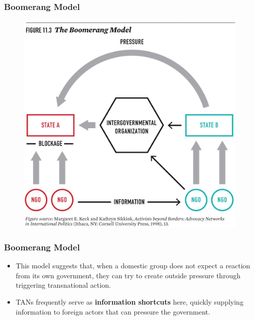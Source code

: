 \documentclass{beamer}
\begin{document}
\begin{frame} 
	\frametitle{\LARGE{Boomerang Model}}
	\begin{figure}[ht!]
		\centering
		\includegraphics[width=\textwidth,height=0.9\textheight,keepaspectratio]{boomerang.jpg}
	\end{figure}
\end{frame}

\begin{frame} 
	\frametitle{\LARGE{Boomerang Model}}
	\begin{itemize}
		\item This model suggests that, when a domestic group does not expect a reaction from its own government, they can try to create outside pressure through triggering transnational action. \pause
		\item TANs frequently serve as \textbf{information shortcuts} here, quickly supplying information to foreign actors that can pressure the government.
		
	\end{itemize}
\end{frame}
\end{document}

